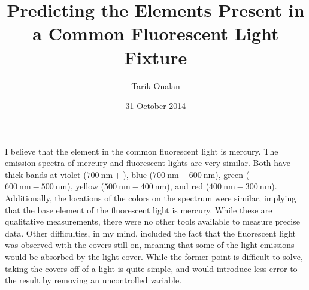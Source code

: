 \documentclass{article}
\title{Predicting the Elements Present in a Common Fluorescent Light Fixture}
\date{31 October 2014}
\author{Tarik Onalan}
\begin{document}
    \maketitle

    I believe that the element in the common fluorescent light is mercury. The emission
    spectra of mercury and fluorescent lights are very similar. Both have thick bands at violet
    (\(\SI{700}{\nm}+\)), blue (\(\SI{700}{\nm}-\SI{600}{\nm}\)), green (\(\SI{600}{\nm}-\SI{500}{\nm}\)),
    yellow (\(\SI{500}{\nm}-\SI{400}{\nm}\)), and red (\(\SI{400}{\nm}-\SI{300}{\nm}\)). Additionally,
    the locations of the colors on the spectrum were similar, implying that the base element of
    the fluorescent light is mercury. While these are qualitative measurements, there were no other
    tools available to measure precise data. Other difficulties, in my mind, included the fact
    that the fluorescent light was observed with the covers still on, meaning that some of the light
    emissions would be absorbed by the light cover. While the former point is difficult to solve,
    taking the covers off of a light is quite simple, and would introduce less error to the result
    by removing an uncontrolled variable.
\end{document}
